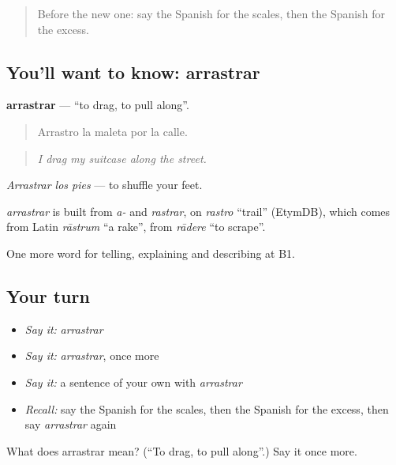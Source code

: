 \label{lesson:ES-C668-arrastrar}



\begin{quote}
Before the new one: say the Spanish for the scales, then the Spanish for the excess.
\end{quote}

\subsection*{You'll want to know: arrastrar}
\textbf{arrastrar} — \textquotedblleft{}to drag, to pull along\textquotedblright{}.

\begin{quote}
Arrastro la maleta por la calle.
\end{quote}

\begin{quote}
\emph{I drag my suitcase along the street.}
\end{quote}

\emph{Arrastrar los pies} — to shuffle your feet.

\begin{cousinweb}
\emph{arrastrar} is built from \emph{a-} and \emph{rastrar}, on \emph{rastro} \textquotedblleft{}trail\textquotedblright{} (EtymDB), which comes from Latin \emph{rāstrum} \textquotedblleft{}a rake\textquotedblright{}, from \emph{rādere} \textquotedblleft{}to scrape\textquotedblright{}.
\end{cousinweb}

\begin{grammarlens}[title={What you've built}]
One more word for telling, explaining and describing at B1.
\end{grammarlens}

\subsection*{Your turn}
\begin{itemize}
\raggedright
  \item \emph{Say it:} \emph{arrastrar}
  \item \emph{Say it:} \emph{arrastrar}, once more
  \item \emph{Say it:} a sentence of your own with \emph{arrastrar}
  \item \emph{Recall:} say the Spanish for the scales, then the Spanish for the excess, then say \emph{arrastrar} again
\end{itemize}

\begin{tcolorbox}[breakable,colback=teal!4,colframe=teal!35!black,title={Before you move on}]
What does arrastrar mean? (\textquotedblleft{}To drag, to pull along\textquotedblright{}.) Say it once more.
\end{tcolorbox}
